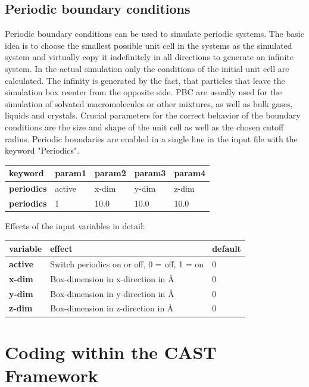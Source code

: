 \documentclass[10pt,a4paper]{article} %
\begin{document}
	\subsection{Periodic boundary conditions}
	Periodic boundary conditions can be used to simulate periodic systems. The basic idea is to choose the smallest possible unit cell in the systems as the simulated system and virtually copy it indefinitely in all directions to generate an infinite system. In the actual simulation only the conditions of the initial unit cell are calculated. The infinity is generated by the fact, that particles that leave the simulation box reenter from the opposite side. \acf{PBC} are usually used for the simulation of solvated macromolecules or other mixtures, as well as bulk gases, liquids and crystals. Crucial parameters for the correct behavior of the boundary conditions are the size and shape of the unit cell as well as the chosen cutoff radius. Periodic boundaries are enabled in a single line in the input file with the keyword "Periodics".\\
	\begin{longtable}{l|l|l|l|l}
		\textbf{keyword} & param1 & param2 & param3 & param4 \\
		\hline
		\textbf{periodics} & active & x-dim & y-dim & z-dim \\
		\textbf{periodics} & 1 & 10.0 & 10.0 & 10.0 \\
	\end{longtable}

	Effects of the input variables in detail:
	\begin{longtable}{|p{3cm}|p{6.5cm}|p{1.5cm}|}
		\textbf{variable} & effect & default \\
		\hline
		\textbf{active} & Switch periodics on or off, 0 = off, 1 = on & 0 \\
		\textbf{x-dim} & Box-dimension in x-direction in \AA & 0 \\
		\textbf{y-dim} & Box-dimension in y-direction in \AA & 0 \\
		\textbf{z-dim} & Box-dimension in z-direction in \AA & 0 \\
	\end{longtable}


	\newpage
	\section{Coding within the CAST Framework}
\end{document}
